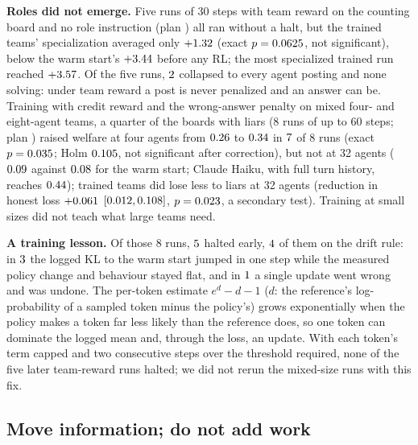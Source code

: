\documentclass{article}
\begin{document}
\textbf{Roles did not emerge.} Five runs of 30 steps with team reward on the counting board and no role instruction (plan \texttt{\PartBPlanHash}) all ran without a halt, but the trained teams' specialization averaged only $+1.32$ (exact $p = 0.0625$, not significant), below the warm start's $+3.44$ before any RL; the most specialized trained run reached $+3.57$. Of the five runs, $2$ collapsed to every agent posting and none solving: under team reward a post is never penalized and an answer can be. Training with credit reward and the wrong-answer penalty on mixed four- and eight-agent teams, a quarter of the boards with liars (8 runs of up to 60 steps; plan \texttt{\SeventeenPlanHash}) raised welfare at four agents from $0.26$ to $0.34$ in $7$ of 8 runs (exact $p = 0.035$; Holm $0.105$, not significant after correction), but not at 32 agents ($0.09$ against $0.08$ for the warm start; Claude Haiku, with full turn history, reaches $0.44$); trained teams did lose less to liars at 32 agents (reduction in honest loss $+0.061$ $[0.012, 0.108]$, $p = 0.023$, a secondary test). Training at small sizes did not teach what large teams need.

\textbf{A training lesson.} Of those 8 runs, $5$ halted early, $4$ of them on the drift rule: in $3$ the logged KL to the warm start jumped in one step while the measured policy change and behaviour stayed flat, and in $1$ a single update went wrong and was undone. The per-token estimate $e^{d} - d - 1$ ($d$: the reference's log-probability of a sampled token minus the policy's) grows exponentially when the policy makes a token far less likely than the reference does, so one token can dominate the logged mean and, through the loss, an update. With each token's term capped and two consecutive steps over the threshold required, none of the five later team-reward runs halted; we did not rerun the mixed-size runs with this fix.

\subsection{Move information; do not add work}
\label{sec:flow}
\end{document}
